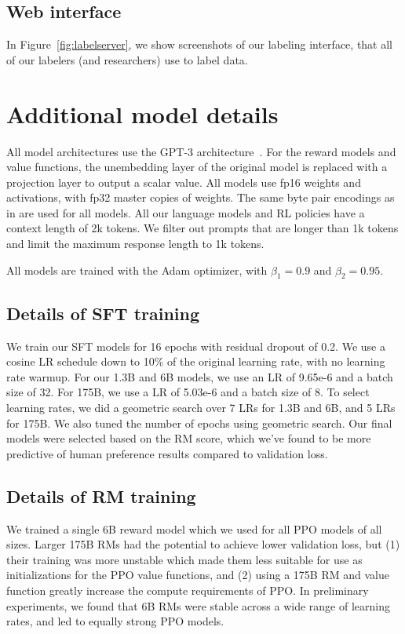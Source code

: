 \documentclass{article}
\begin{document}
\subsection{Web interface}
In Figure~\ref{fig:labelserver}, we show screenshots of our labeling interface, that all of our labelers (and researchers) use to label data. 

\newpage
\section{Additional model details}
\label{apdx:model-details}

All model architectures use the GPT-3 architecture~\citep{brown2020language}. For the reward models and value functions, the unembedding layer of the original model is replaced with a projection layer to output a scalar value. All models use fp16 weights and activations, with fp32 master copies of weights. The same byte pair encodings as in \citet{brown2020language} are used for all models. All our language models and RL policies have a context length of 2k tokens. We filter out prompts that are longer than 1k tokens and limit the maximum response length to 1k tokens.

All models are trained with the Adam optimizer, with $\beta_1=0.9$ and $\beta_2=0.95$.

\subsection{Details of SFT training}
We train our SFT models for 16 epochs with residual dropout of 0.2. We use a cosine LR schedule down to 10\% of the original learning rate, with no learning rate warmup. For our 1.3B and 6B models, we use an LR of 9.65e-6 and a batch size of 32. For 175B, we use a LR of 5.03e-6 and a batch size of 8. To select learning rates, we did a geometric search over 7 LRs for 1.3B and 6B, and 5 LRs for 175B. We also tuned the number of epochs using geometric search. Our final models were selected based on the RM score, which we've found to be more predictive of human preference results compared to validation loss.

\subsection{Details of RM training}
\label{apdx:rm-training}

We trained a single 6B reward model which we used for all PPO models of all sizes. Larger 175B RMs had the potential to achieve lower validation loss, but (1) their training was more unstable which made them less suitable for use as initializations for the PPO value functions, and (2) using a 175B RM and value function greatly increase the compute requirements of PPO. In preliminary experiments, we found that 6B RMs were stable across a wide range of learning rates, and led to equally strong PPO models.
\end{document}
